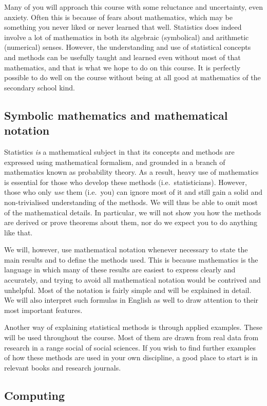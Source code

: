 Many of you will approach this course with some reluctance and
uncertainty, even anxiety. Often this is because of fears about
mathematics, which may be something you never liked or never learned
that well. Statistics does indeed involve a lot of mathematics in both
its algebraic (symbolical) and arithmetic (numerical) senses. However,
the understanding and use of statistical concepts and methods can be
usefully taught and learned even without most of that mathematics, and
that is what we hope to do on this course. It is perfectly possible to
do well on the course without being at all good at mathematics of the
secondary school kind.

\subsection{Symbolic mathematics and mathematical notation}

Statistics \emph{is} a mathematical subject in that its concepts and
methods are expressed using mathematical formalism, and
grounded in a branch of mathematics known as probability theory. As a
result, heavy use of mathematics is essential for those who develop
these methods (i.e.\ statisticians). However, those who only \emph{use}
them (i.e.\ you) can ignore most of it and still gain a solid and
non-trivialised understanding of the methods. We will thus be able to
omit most of the mathematical details. In particular, we will not show
you how the methods are derived or prove theorems about them, nor do we
expect you to do anything like that.

We will, however, use mathematical notation whenever necessary to state
the main results and to define the methods used. This is because
mathematics is the language in which many of these results are easiest
to express clearly and accurately, and trying to avoid all mathematical
notation would be contrived and unhelpful. Most of the notation is
fairly simple and will be explained in detail. We will also interpret
such formulas in English as well to draw attention to their most
important features.

Another way of explaining statistical methods is through applied
examples. These will be used throughout the course. Most of them are
drawn from real data from research in a range social of social sciences.
If you wish to find further examples of how these methods are used in
your own discipline, a good place to start is in relevant books and
research journals.

\subsection{Computing}

